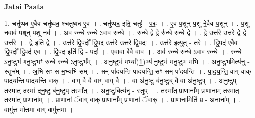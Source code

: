 \documentclass[17pt]{extarticle}
\begin{document}
\textbf{Jatai Paata} \newline

1. चतु॑ष्पद ए॒वैव चतु॑ष्पद॒ श्चतु॑ष्पद ए॒व । . चतु॑ष्पद॒ इति॒ चतुः॑ - प॒दः॒ । . ए॒व प॒शून् प॒शू ने॒वैव प॒शून् । . प॒शू नवाव॑ प॒शून् प॒शू नव॑ । . अव॑ रुन्धे रु॒न्धे ऽवाव॑ रुन्धे । . रु॒न्धे॒ द्वे द्वे रु॑न्धे रुन्धे॒ द्वे । . द्वे उत्त॑रे॒ उत्त॑रे॒ द्वे द्वे उत्त॑रे । . द्वे इति॒ द्वे । . उत्त॑रे द्वि॒पदो᳚ द्वि॒पद॒ उत्त॑रे॒ उत्त॑रे द्वि॒पदः॑ । . उत्त॑रे॒ इत्युत् - त॒रे॒ । . द्वि॒पद॑ ए॒वैव द्वि॒पदो᳚ द्वि॒पद॑ ए॒व । . द्वि॒पद॒ इति॑ द्वि - पदः॑ । . ए॒वावा वै॒वै वाव॑ । . अव॑ रुन्धे रु॒न्धे ऽवाव॑ रुन्धे । . रु॒न्धे॒ ऽनु॒ष्टुभ॑ मनु॒ष्टुभꣳ॑ रुन्धे रुन्धे ऽनु॒ष्टुभ᳚म् । . अ॒नु॒ष्टुभ॑ म॒भ्या᳚(1॒)भ्य॑ नु॒ष्टुभ॑ मनु॒ष्टुभ॑ म॒भि । . अ॒नु॒ष्टुभ॒मित्य॑नु - स्तुभ᳚म् । . अ॒भि सꣳ स म॒भ्य॑भि सम् । . सम् पा॑दयन्ति पादयन्ति॒ सꣳ सम् पा॑दयन्ति । . पा॒द॒य॒न्ति॒ वाग् वाक् पा॑दयन्ति पादयन्ति॒ वाक् । . वाग् वै वै वाग् वाग् वै । . वा अ॑नु॒ष्टु ब॑नु॒ष्टुब् वै वा अ॑नु॒ष्टुप् । . अ॒नु॒ष्टुप् तस्मा॒त् तस्मा॑ दनु॒ष्टु ब॑नु॒ष्टुप् तस्मा᳚त् । . अ॒नु॒ष्टुबित्य॑नु - स्तुप् । . तस्मा᳚त् प्रा॒णाना᳚म् प्रा॒णाना॒म् तस्मा॒त् तस्मा᳚त् प्रा॒णाना᳚म् । . प्रा॒णानां॒ ॅवाग् वाक् प्रा॒णाना᳚म् प्रा॒णानां॒ ॅवाक् । . प्रा॒णाना॒मिति॑ प्र - अ॒नाना᳚म् । . वागु॑त्त॒ मोत्त॒मा वाग् वागु॑त्त॒मा । \newline
\end{document}
